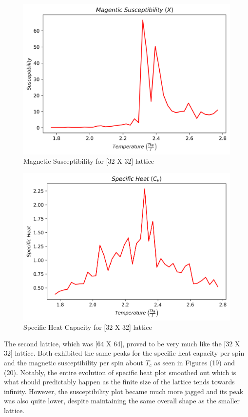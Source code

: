 \documentclass[twocolumn]{article}
\begin{document}
\begin{figure}[H]
\caption{Magnetic Susceptibility for [32 X 32] lattice}
\centering
\includegraphics[scale=.45]{MagSuscept32}
\end{figure}
\begin{figure}[H]
\caption{Specific Heat Capacity for [32 X 32] lattice}
\centering
\includegraphics[scale=.45]{SpecificHeat32}
\end{figure}
The second lattice, which was [64 X 64], proved to be very much like the [32 X 32] lattice. Both exhibited the same peaks for the specific heat capacity per spin and the magnetic susceptibility per spin about $T_c$ as seen in Figures (19) and (20). Notably, the entire evolution of specific heat plot smoothed out which is what should predictably happen as the finite size of the lattice tends towards infinity. However, the susceptibility plot became much more jagged and its peak was also quite lower, despite maintaining the same overall shape as the smaller lattice.
\end{document}
